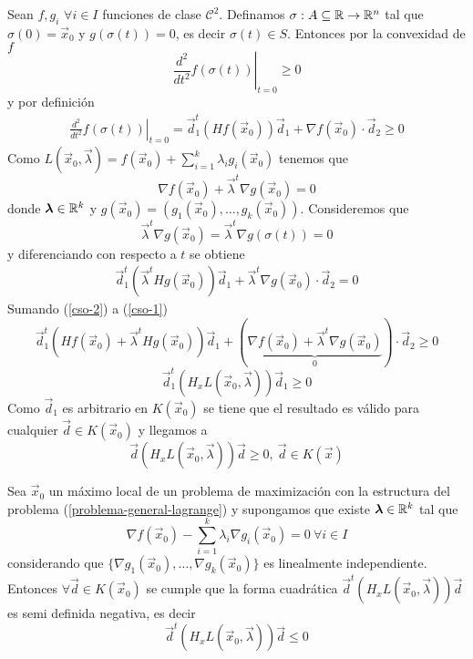 \begin{demostracion}
Sean $f,g_i$ $\forall i\in I$ funciones de clase $\mathcal{C}^2$. Definamos $\sigma : A\subseteq \mathbb{R} \to \mathbb{R}^n$ tal que $\sigma (0) = \vec{x}_0$ y $g(\sigma (t))=0$, es decir $\sigma (t)\in S$. Entonces por la convexidad de $f$
$$\left.\frac{d^2}{dt^2}f(\sigma (t))\right|_{t=0} \geq 0$$
y por definici\'on
\begin{gather}\label{cso-1}
\left.\frac{d^2}{dt^2}f(\sigma (t))\right|_{t=0} = \vec{d}_1^t (H f(\vec{x}_0)) \vec{d}_1 + \nabla f(\vec{x}_0) \cdot \vec{d}_2 \geq 0 \tag{*}
\end{gather}
Como $L(\vec{x}_0,\vec{\lambda})=f(\vec{x}_0)+\sum_{i=1}^k \lambda_i g_i(\vec{x}_0)$ tenemos que 
$$\nabla f(\vec{x}_0) + \vec{\lambda}^t \nabla g(\vec{x}_0)=0$$
donde $\boldsymbol{\lambda} \in \mathbb{R}^k$ y $g(\vec{x}_0)=(g_1(\vec{x}_0),\ldots , g_k(\vec{x}_0))$. 
Consideremos que 
$$\vec{\lambda}^t \nabla g(\vec{x}_0)=\vec{\lambda}^t \nabla g(\sigma (t)) = 0$$
y diferenciando con respecto a $t$ se obtiene
\begin{gather}\label{cso-2}
\vec{d}_1^t (\vec{\lambda}^t H g(\vec{x}_0)) \vec{d}_1 + \vec{\lambda}^t \nabla g(\vec{x}_0) \cdot \vec{d}_2 = 0 \tag{**}
\end{gather}
Sumando (\ref{cso-2}) a (\ref{cso-1}) 
$$\vec{d}_1^t (H f(\vec{x}_0) + \vec{\lambda}^t H g(\vec{x}_0)) \vec{d}_1 + (\underbrace{\nabla f(\vec{x}_0) + \vec{\lambda}^t \nabla g(\vec{x}_0)}_{0}) \cdot \vec{d}_2 \geq 0$$
$$\vec{d}_1^t (H_x L(\vec{x}_0,\vec{\lambda})) \vec{d}_1 \geq 0$$
Como $\vec{d}_1$ es arbitrario en $K(\vec{x}_0)$ se tiene que el resultado es v\'alido para cualquier $\vec{d}\in K(\vec{x}_0)$ y llegamos a
$$\vec{d} (H_x L(\vec{x}_0,\vec{\lambda}))\vec{d} \geq 0 ,\: \vec{d}\in K(\vec{x})$$ 
\end{demostracion}

\begin{teorema}\label{cso-lagrange22}
Sea $\vec{x}_0$ un m\'aximo local de un problema de maximizaci\'on con la estructura del problema (\ref{problema-general-lagrange}) y supongamos que existe $\boldsymbol{\lambda} \in \mathbb{R}^k$ tal que
$$\nabla f(\vec{x}_0) - \sum_{i=1}^k \lambda_i \nabla g_i(\vec{x}_0)=0 \: \forall i\in I$$
considerando que $\{\nabla g_1(\vec{x}_0),\ldots ,\nabla g_k(\vec{x}_0) \}$ es linealmente independiente. Entonces $\forall \vec{d}\in K(\vec{x}_0)$ se cumple que la forma cuadr\'atica $\vec{d}^t (H_x L(\vec{x}_0,\vec{\lambda})) \vec{d}$ es semi definida negativa, es decir
$$\vec{d}^t (H_x L(\vec{x}_0,\vec{\lambda})) \vec{d} \leq 0 $$
\end{teorema}

